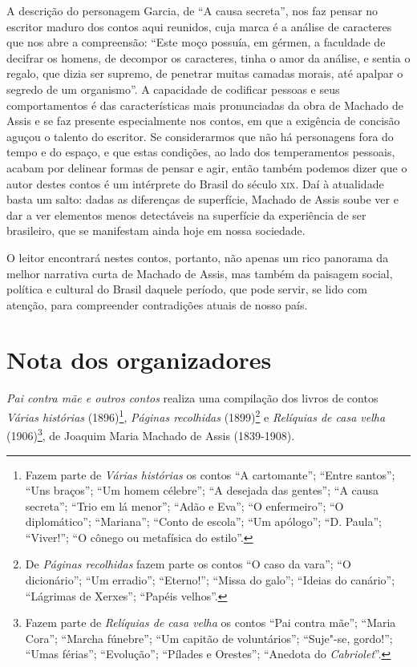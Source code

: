 A descrição do personagem Garcia, de ``A causa secreta'', nos faz pensar
no escritor maduro dos contos aqui reunidos, cuja marca é a análise de
caracteres que nos abre a compreensão: ``Este moço possuía, em gérmen, a
faculdade de decifrar os homens, de decompor os caracteres, tinha o amor
da análise, e sentia o regalo, que dizia ser supremo, de penetrar muitas
camadas morais, até apalpar o segredo de um organismo''. A capacidade de
codificar pessoas e seus comportamentos é das características mais
pronunciadas da obra de Machado de Assis e se faz presente especialmente
nos contos, em que a exigência de concisão aguçou o talento do escritor.
Se considerarmos que não há personagens fora do tempo e do espaço, e que
estas condições, ao lado dos temperamentos pessoais, acabam por delinear
formas de pensar e agir, então também podemos dizer que o autor destes
contos é um intérprete do Brasil do século \textsc{xix}. Daí à atualidade basta
um salto: dadas as diferenças de superfície, Machado de Assis soube ver
e dar a ver elementos menos detectáveis na superfície da experiência de
ser brasileiro, que se manifestam ainda hoje em nossa sociedade.

O leitor encontrará nestes contos, portanto, não apenas um rico panorama
da melhor narrativa curta de Machado de Assis, mas também da paisagem
social, política e cultural do Brasil daquele período, que pode servir,
se lido com atenção, para compreender contradições atuais de nosso país.


\chapter{Nota dos organizadores}

\emph{Pai contra mãe e outros contos} realiza uma compilação dos livros
de contos \emph{Várias histórias} (1896)\footnote{Fazem parte de
  \emph{Várias histórias} os contos ``A cartomante''; ``Entre santos'';
  ``Uns braços''; ``Um homem célebre''; ``A desejada das gentes''; ``A
  causa secreta''; ``Trio em lá menor''; ``Adão e Eva''; ``O
  enfermeiro''; ``O diplomático''; ``Mariana''; ``Conto de escola'';
  ``Um apólogo''; ``D. Paula''; ``Viver!''; ``O cônego ou metafísica do
  estilo''.}, \emph{Páginas recolhidas} (1899)\footnote{De \emph{Páginas
  recolhidas} fazem parte os contos ``O caso da vara''; ``O
  dicionário''; ``Um erradio''; ``Eterno!''; ``Missa do galo''; ``Ideias
  do canário''; ``Lágrimas de Xerxes''; ``Papéis velhos''.} e
\emph{Relíquias de casa velha} (1906)\footnote{Fazem parte de
  \emph{Relíquias de casa velha} os contos ``Pai contra mãe''; ``Maria
  Cora''; ``Marcha fúnebre''; ``Um capitão de voluntários''; ``Suje"-se,
  gordo!''; ``Umas férias''; ``Evolução''; ``Pílades e Orestes'';
  ``Anedota do \emph{Cabriolet}''.}, de Joaquim Maria Machado de Assis
(1839-1908).

